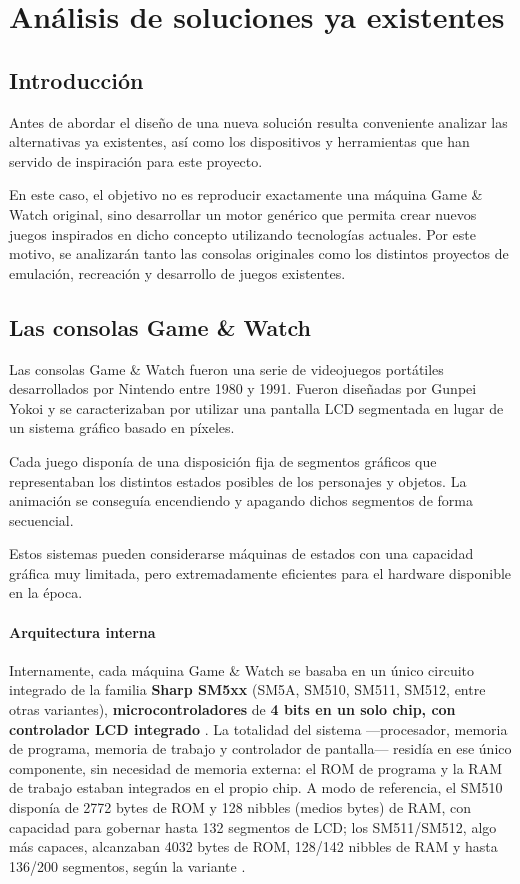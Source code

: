 \documentclass[../main.tex]{subfiles}
\begin{document}
	\chapter{Análisis de soluciones ya existentes}
	\label{C:estado_arte}

	\section{Introducción} Antes de abordar el diseño de una nueva solución resulta conveniente analizar las alternativas ya existentes, así como los dispositivos y herramientas que han servido de inspiración para este proyecto.

	En este caso, el objetivo no es reproducir exactamente una máquina Game \& Watch original, sino desarrollar un motor genérico que permita crear nuevos juegos inspirados en dicho concepto utilizando tecnologías actuales. Por este motivo, se analizarán tanto las consolas originales como los distintos proyectos de emulación, recreación y desarrollo de juegos existentes.


	\section{Las consolas Game \& Watch}
	\label{sec:consolas-gw}
	Las consolas Game \& Watch fueron una serie de videojuegos portátiles desarrollados por Nintendo entre 1980 y 1991. Fueron diseñadas por Gunpei Yokoi y se caracterizaban por utilizar una pantalla LCD segmentada en lugar de un sistema gráfico basado en píxeles.

	Cada juego disponía de una disposición fija de segmentos gráficos que representaban los distintos estados posibles de los personajes y objetos. La animación se conseguía encendiendo y apagando dichos segmentos de forma secuencial.

	Estos sistemas pueden considerarse máquinas de estados con una capacidad gráfica muy limitada, pero extremadamente eficientes para el hardware disponible en la época.

	\subsubsection{Arquitectura interna}

	Internamente, cada máquina Game \& Watch se basaba en un único circuito integrado de la familia \textbf{Sharp SM5xx} (SM5A, SM510, SM511, SM512, entre otras variantes), \textbf{microcontroladores} de \textbf{4 bits en un solo chip, con controlador LCD integrado} \cite{retroreversing_gw}. La totalidad del sistema —procesador, memoria de programa, memoria de trabajo y controlador de pantalla— residía en ese único componente, sin necesidad de memoria externa: el ROM de programa y la RAM de trabajo estaban integrados en el propio chip. A modo de referencia, el SM510 disponía de 2772 bytes de ROM y 128 nibbles (medios bytes) de RAM, con capacidad para gobernar hasta 132 segmentos de LCD; los SM511/SM512, algo más capaces, alcanzaban 4032 bytes de ROM, 128/142 nibbles de RAM y hasta 136/200 segmentos, según la variante \cite{sm5_reverse_eng}.
\end{document}
